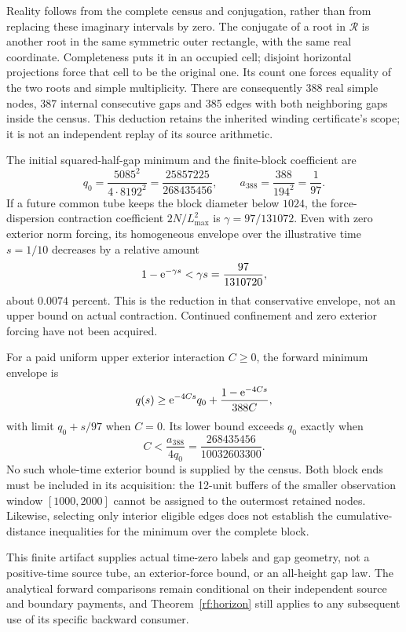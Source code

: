 Reality follows from the complete census and conjugation, rather than
from replacing these imaginary intervals by zero. The conjugate of a
root in $\mathcal R$ is another root in the same symmetric outer
rectangle, with the same real coordinate. Completeness puts it in an
occupied cell; disjoint horizontal projections force that cell to be
the original one. Its count one forces equality of the two roots and
simple multiplicity. There are consequently 388 real simple nodes,
387 internal consecutive gaps and 385 edges with both neighboring gaps
inside the census. This deduction retains the inherited winding
certificate's scope; it is not an independent replay of its source
arithmetic.

The initial squared-half-gap minimum and the finite-block coefficient are
\begin{equation}
 q_0=\frac{5085^2}{4\cdot8192^2}
       =\frac{25857225}{268435456},\qquad
 a_{388}=\frac{388}{194^2}=\frac1{97}.
 \label{supp:census-constants}
\end{equation}
If a future common tube keeps the block diameter below $1024$, the
force-dispersion contraction coefficient $2N/L_{\max}^2$ is
$\gamma=97/131072$. Even with zero exterior norm forcing, its
homogeneous envelope over the illustrative time $s=1/10$ decreases by
a relative amount
\[
 1-\mathrm e^{-\gamma s}<\gamma s=\frac{97}{1310720},
\]
about $0.0074$ percent. This is the reduction in that conservative
envelope, not an upper bound on actual contraction. Continued
confinement and zero exterior forcing have not been acquired.

For a paid uniform upper exterior interaction $C\ge0$, the forward
minimum envelope is
\[
 q(s)\ge\mathrm e^{-4Cs}q_0+
          \frac{1-\mathrm e^{-4Cs}}{388C},
\]
with limit $q_0+s/97$ when $C=0$. Its lower bound exceeds $q_0$ exactly
when
\begin{equation}
 C<\frac{a_{388}}{4q_0}
   =\frac{268435456}{10032603300}.
 \label{supp:census-exterior-target}
\end{equation}
No such whole-time exterior bound is supplied by the census. Both block
ends must be included in its acquisition: the 12-unit buffers of the
smaller observation window $[1000,2000]$ cannot be assigned to the
outermost retained nodes. Likewise, selecting only interior eligible
edges does not establish the cumulative-distance inequalities for the
minimum over the complete block.

This finite artifact supplies actual time-zero labels and gap geometry,
not a positive-time source tube, an exterior-force bound, or an all-height
gap law. The analytical forward comparisons remain conditional on their
independent source and boundary payments, and Theorem~\ref{rf:horizon}
still applies to any subsequent use of its specific backward consumer.
